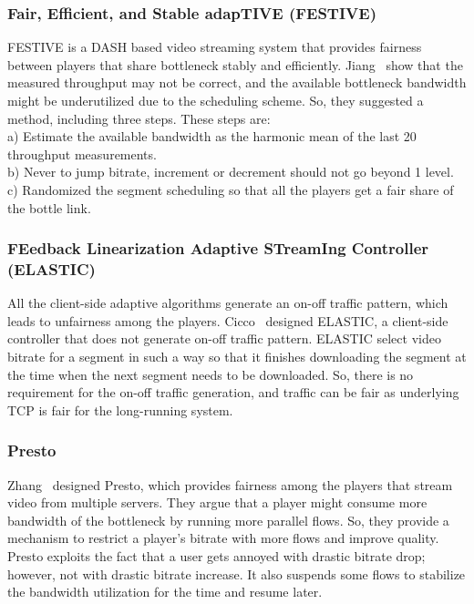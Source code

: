 \subsubsection{Fair, Efficient, and Stable adapTIVE (FESTIVE)}
FESTIVE\cite{10.1145/2413176.2413189} is a DASH based video streaming system that provides fairness between players that share bottleneck stably and efficiently. Jiang \etal\ show that the measured throughput may not be correct, and the available bottleneck bandwidth might be underutilized due to the scheduling scheme. So, they suggested a method, including three steps. These steps are:\\
a) Estimate the available bandwidth as the harmonic mean of the last 20 throughput measurements.\\
b) Never to jump bitrate, increment or decrement should not go beyond 1 level. \\
c) Randomized the segment scheduling so that all the players get a fair share of the bottle link.

\subsubsection{FEedback Linearization Adaptive STreamIng Controller (ELASTIC)}
All the client-side adaptive algorithms generate an on-off traffic pattern, which leads to unfairness among the players. Cicco \etal\ designed ELASTIC\cite{6691442}, a client-side controller that does not generate on-off traffic pattern. ELASTIC select video bitrate for a segment in such a way so that it finishes downloading the segment at the time when the next segment needs to be downloaded. So, there is no requirement for the on-off traffic generation, and traffic can be fair as underlying TCP is fair for the long-running system.

\subsubsection{Presto}
Zhang \etal\ designed Presto\cite{7249417}, which provides fairness among the players that stream video from multiple servers. They argue that a player might consume more bandwidth of the bottleneck by running more parallel flows. So, they provide a mechanism to restrict a player's bitrate with more flows and improve quality. Presto exploits the fact that a user gets annoyed with drastic bitrate drop; however, not with drastic bitrate increase\cite{10.1145/2018602.2018611}. It also suspends some flows to stabilize the bandwidth utilization for the time and resume later.

